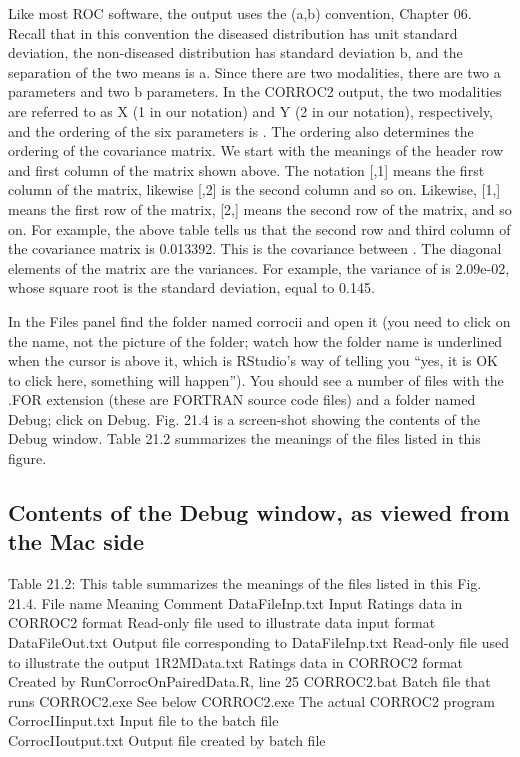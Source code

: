 \documentclass[
]{book}
\begin{document}
Like most ROC software, the output uses the (a,b) convention, Chapter 06. Recall that in this convention the diseased distribution has unit standard deviation, the non-diseased distribution has standard deviation b, and the separation of the two means is a. Since there are two modalities, there are two a parameters and two b parameters. In the CORROC2 output, the two modalities are referred to as X (1 in our notation) and Y (2 in our notation), respectively, and the ordering of the six parameters is . The ordering also determines the ordering of the covariance matrix. We start with the meanings of the header row and first column of the matrix shown above. The notation {[},1{]} means the first column of the matrix, likewise {[},2{]} is the second column and so on. Likewise, {[}1,{]} means the first row of the matrix, {[}2,{]} means the second row of the matrix, and so on. For example, the above table tells us that the second row and third column of the covariance matrix is 0.013392. This is the covariance between . The diagonal elements of the matrix are the variances. For example, the variance of is 2.09e-02, whose square root is the standard deviation, equal to 0.145.

In the Files panel find the folder named corrocii and open it (you need to click on the name, not the picture of the folder; watch how the folder name is underlined when the cursor is above it, which is RStudio's way of telling you ``yes, it is OK to click here, something will happen''). You should see a number of files with the .FOR extension (these are FORTRAN source code files) and a folder named Debug; click on Debug. Fig. 21.4 is a screen-shot showing the contents of the Debug window. Table 21.2 summarizes the meanings of the files listed in this figure.

\hypertarget{bivariate-binormal-model-corroc2-application-debug-window}{%
\subsection{Contents of the Debug window, as viewed from the Mac side}\label{bivariate-binormal-model-corroc2-application-debug-window}}

Table 21.2: This table summarizes the meanings of the files listed in this Fig. 21.4.
File name Meaning Comment
DataFileInp.txt Input Ratings data in CORROC2 format Read-only file used to illustrate data input format
DataFileOut.txt Output file corresponding to DataFileInp.txt Read-only file used to illustrate the output
1R2MData.txt Ratings data in CORROC2 format Created by RunCorrocOnPairedData.R, line 25
CORROC2.bat Batch file that runs CORROC2.exe See below
CORROC2.exe The actual CORROC2 program\\
CorrocIIinput.txt Input file to the batch file\\
CorrocIIoutput.txt Output file created by batch file
\end{document}
